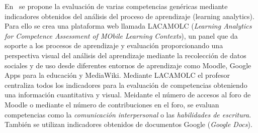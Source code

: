 En~\cite{rayon2014web} se propone la evaluación de varias competencias genéricas mediante indicadores obtenidos del análisis del proceso de aprendizaje (learning analytics). Para ello se crea una plataforma web llamada LACAMOLC (\emph{Learning Analytics for Competence Assessment of MObile Learning Contexts}), un panel que da soporte a los procesos de aprendizaje y evaluación proporcionando una perspectiva visual del análisis del aprendizaje mediante la recolección de datos sociales y de uso desde diferentes entornos de aprendizaje como Moodle, Google Apps para la educación y MediaWiki. Mediante LACAMOLC el profesor centraliza todos los indicadores para la evaluación de competencias obteniendo una información cuantitativa y visual. Meidante el número de accesos al foro de Moodle o mediante el número de contribuciones en el foro, se evaluan competencias como la \emph{comunicación interpersonal} o las \emph{habilidades de escritura}. También se utilizan indicadores obtenidos de documentos Google (\emph{Google Docs}).

